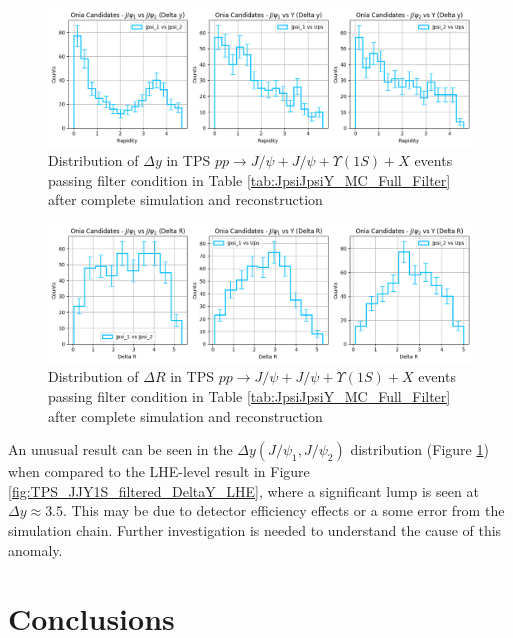 \documentclass[10pt,twocolumn]{article}
\begin{document}
\begin{figure}[!htbp]
    \centering
    \includegraphics[width=1.0\linewidth]{images/Ntuple_LEVEL_TPS_DeltaY_filtered.png}
    \caption{Distribution of $\Delta y$ in TPS $pp\to J/\psi+J/\psi+\Upsilon(1S)+X$ events passing filter condition in Table \ref{tab:JpsiJpsiY_MC_Full_Filter} after complete simulation and reconstruction}
    \label{fig:TPS_JJY1S_filtered_DeltaY_Ntuple}
\end{figure}

\begin{figure}[!htbp]
    \centering
    \includegraphics[width=1.0\linewidth]{images/Ntuple_LEVEL_TPS_DeltaR_filtered.png}
    \caption{Distribution of $\Delta R$ in TPS $pp\to J/\psi+J/\psi+\Upsilon(1S)+X$ events passing filter condition in Table \ref{tab:JpsiJpsiY_MC_Full_Filter} after complete simulation and reconstruction}
    \label{fig:TPS_JJY1S_filtered_DeltaR_Ntuple}
\end{figure}

An unusual result can be seen in the $\Delta y (J/\psi_1, J/\psi_2)$ distribution (Figure \ref{fig:TPS_JJY1S_filtered_DeltaY_Ntuple}) when compared to the LHE-level result in Figure \ref{fig:TPS_JJY1S_filtered_DeltaY_LHE}, where a significant lump is seen at $\Delta y \approx 3.5$. This may be due to detector efficiency effects or a some error from the simulation chain. Further investigation is needed to understand the cause of this anomaly.

\section{Conclusions}
\end{document}
